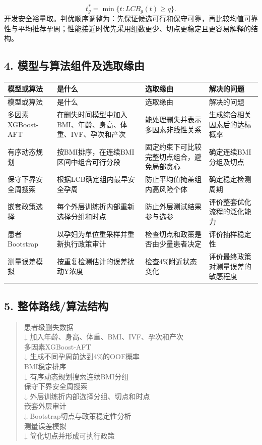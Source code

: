 \documentclass[UTF8,12pt,a4paper]{ctexart}
\begin{document}
\[
t_g^*=\min\{t:LCB_g(t)\ge q\}.
\]
开发安全裕量取\textsf{}。判优顺序调整为：先保证候选可行和保守可靠，再比较均值可靠性与平均推荐孕周；性能接近时优先采用组数更少、切点更稳定且更容易解释的结构。

\subsection{4. 模型与算法组件及选取缘由}
\begingroup
\footnotesize
\setlength{\tabcolsep}{1.5pt}
\begin{longtable}{|>{\raggedright\arraybackslash}p{}|>{\raggedright\arraybackslash}p{}|>{\raggedright\arraybackslash}p{}|>{\raggedright\arraybackslash}p{}|}
\hline
模型或算法 & 是什么 & 选取缘由 & 解决的问题 \\ \hline
\endfirsthead
\hline
模型或算法 & 是什么 & 选取缘由 & 解决的问题 \\ \hline
\endhead
多因素XGBoost-AFT & 在删失时间模型中加入BMI、年龄、身高、体重、IVF、孕次和产次 & 能处理删失并表示多因素非线性关系 & 生成综合相关因素后的达标概率 \\ \hline
有序动态规划 & 按BMI排序，在连续BMI区间中组合可行分段 & 固定约束下可比较完整切点组合，避免局部贪心 & 确定连续BMI分组及切点 \\ \hline
保守下界安全周搜索 & 根据LCB确定组内最早安全孕周 & 防止平均值掩盖组内高风险个体 & 确定稳定检测周期 \\ \hline
嵌套政策选择 & 每个外层训练折内部重新选择分组和时点 & 防止外层测试结果参与选参 & 评价整套优化流程的泛化能力 \\ \hline
患者Bootstrap & 以孕妇为单位重采样并重新执行政策审计 & 检查切点和政策是否由少量患者决定 & 评价抽样稳定性 \\ \hline
测量误差模拟 & 按重复检测估计的误差扰动Y浓度 & 检查4\%附近状态变化 & 评价最终政策对测量误差的敏感程度 \\ \hline
\end{longtable}
\endgroup

\subsection{5. 整体路线/算法结构}
\begin{quote}\small\sffamily
患者级删失数据\\
        ↓ 加入年龄、身高、体重、BMI、IVF、孕次和产次\\
多因素XGBoost-AFT\\
        ↓ 生成不同孕周前达到4\%的OOF概率\\
BMI稳定排序\\
        ↓ 有序动态规划搜索连续BMI分组\\
保守下界安全周搜索\\
        ↓ 外层训练折内部选择分组、切点和时点\\
嵌套外层审计\\
        ↓ Bootstrap切点与政策稳定性分析\\
测量误差模拟\\
        ↓ 简化切点并形成可执行政策\\
\end{quote}
\end{document}

